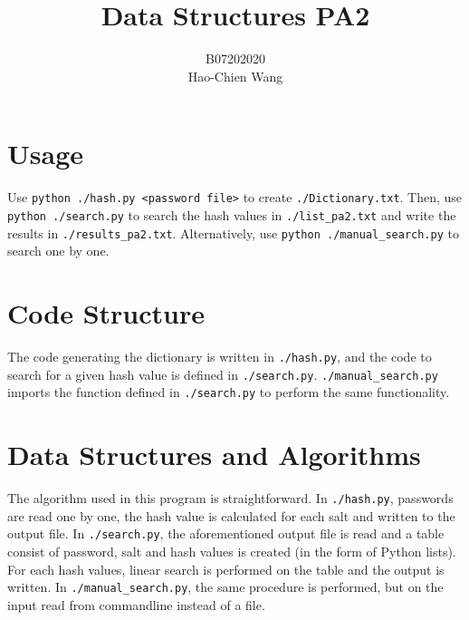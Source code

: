 \documentclass[12pt]{article}
\title{Data Structures PA2}
\author{{\scriptsize B07202020}\\Hao-Chien Wang}
\begin{document}
\maketitle

\section{Usage}%
Use \texttt{python ./hash.py <password file>} to create \texttt{./Dictionary.txt}.
Then, use \texttt{python ./search.py} to search the hash values in 
\texttt{./list\_pa2.txt} and write the results in \texttt{./results\_pa2.txt}.
Alternatively, use \texttt{python ./manual\_search.py} to search one by one.

\section{Code Structure}%

The code generating the dictionary is written in \texttt{./hash.py}, and the
code to search for a given hash value is defined in \texttt{./search.py}.
\texttt{./manual\_search.py} imports the function defined in \texttt{./search.py}
to perform the same functionality.

\section{Data Structures and Algorithms}%

The algorithm used in this program is straightforward. In \texttt{./hash.py},
passwords are read one by one, the hash value is calculated for each salt and
written to the output file. In \texttt{./search.py}, the aforementioned output
file is read and a table consist of password, salt and hash values is created 
(in the form of Python lists). For each hash values, linear search is performed
on the table and the output is written. In \texttt{./manual\_search.py}, 
the same procedure is performed, but on the input read from commandline instead
of a file.
\end{document}

